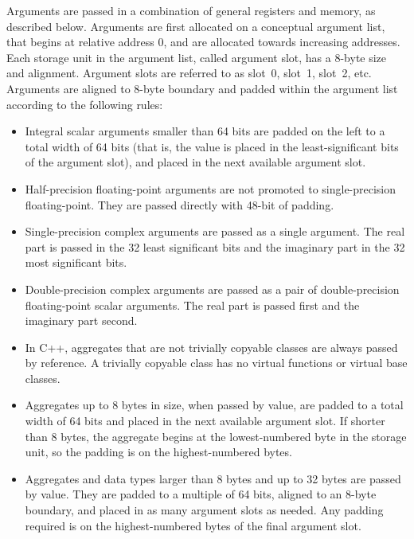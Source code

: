 Arguments are passed in a combination of general registers and memory, as
described below. Arguments are first allocated on a conceptual argument list,
that begins at relative address 0, and are allocated towards increasing
addresses. Each storage unit in the argument list, called argument slot, has a
8-byte size and alignment. Argument slots are referred to as slot~0, slot~1,
slot~2, etc.  Arguments are aligned to 8-byte boundary and padded within the
argument list according to the following rules: \begin{itemize}

\item  Integral scalar arguments smaller than 64 bits are padded on the left to
    a total width of 64 bits (that is, the value is placed in the
    least-significant bits of the argument slot), and placed in the next
    available argument slot.

\item Half-precision floating-point arguments are not promoted to
    single-precision floating-point. They are passed directly with 48-bit of
    padding.

\item Single-precision complex arguments are passed as a single argument.  The
    real part is passed in the 32 least significant bits and the imaginary part
    in the 32 most significant bits.

\item Double-precision complex arguments are passed as a pair of
    double-precision floating-point scalar arguments. The real part is passed
    first and the imaginary part second.

\item In C++, aggregates that are not trivially copyable classes are always
    passed by reference. A trivially copyable class has no virtual functions or
    virtual base classes.

\item Aggregates up to 8 bytes in size, when passed by value, are padded to a
    total width of 64 bits and placed in the next available argument slot. If
    shorter than 8 bytes, the aggregate begins at the lowest-numbered byte in
    the storage unit, so the padding is on the highest-numbered bytes.

\item Aggregates and data types larger than 8 bytes and up to 32 bytes are
    passed by value. They are padded to a multiple of 64 bits, aligned to an
    8-byte boundary, and placed in as many argument slots as needed. Any
    padding required is on the highest-numbered bytes of the final argument slot.


\end{itemize}

